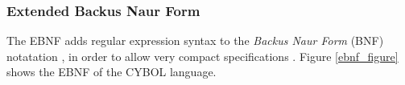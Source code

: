 %
%
%
%
%
%
%

\subsubsection{Extended Backus Naur Form}
\label{extended_backus_naur_form_heading}

The EBNF adds regular expression syntax to the \emph{Backus Naur Form} (BNF)
notatation \cite{naur}, in order to allow very compact specifications
\cite{kuhn}. Figure \ref{ebnf_figure} shows the EBNF of the CYBOL language.

